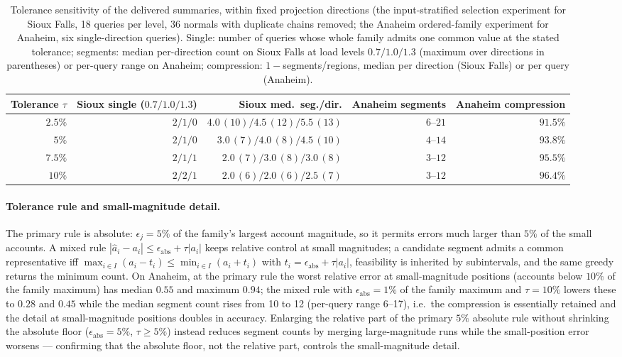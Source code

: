 \begin{table}[pos=htbp]\centering\footnotesize
\caption{Tolerance sensitivity of the delivered summaries, within
fixed projection directions (the input-stratified selection experiment for Sioux Falls, 18 queries
per level, 36 normals with duplicate chains removed; the Anaheim ordered-family experiment for
Anaheim, six single-direction queries). Single: number of queries whose
whole family admits one common value at the stated tolerance;
segments: median per-direction count on Sioux Falls at load levels
$0.7/1.0/1.3$ (maximum over directions in parentheses) or per-query
range on Anaheim; compression: $1-$segments/regions, median per
direction (Sioux Falls) or per query (Anaheim).}\label{tab:tolerance}
\begin{tabular}{rrrrr}\toprule
Tolerance $\tau$ & Sioux single ($0.7/1.0/1.3$) & Sioux med.\ seg./dir. & Anaheim segments & Anaheim compression\\\midrule
$2.5\%$ & $2/1/0$ & $4.0\,(10)/4.5\,(12)/5.5\,(13)$ & $6$--$21$ & $91.5\%$\\
$5\%$ & $2/1/0$ & $3.0\,(7)/4.0\,(8)/4.5\,(10)$ & $4$--$14$ & $93.8\%$\\
$7.5\%$ & $2/1/1$ & $2.0\,(7)/3.0\,(8)/3.0\,(8)$ & $3$--$12$ & $95.5\%$\\
$10\%$ & $2/2/1$ & $2.0\,(6)/2.0\,(6)/2.5\,(7)$ & $3$--$12$ & $96.4\%$\\
\bottomrule\end{tabular}\end{table}

\paragraph{Tolerance rule and small-magnitude detail.}\label{supp:tolerance}
The primary rule is absolute: $\epsilon_j=5\%$ of the family's largest
account magnitude, so it permits errors much larger than $5\%$ of the
small accounts. A mixed rule
$|\hat a_i-a_i|\le\epsilon_{\mathrm{abs}}+\tau|a_i|$ keeps relative
control at small magnitudes; a candidate segment admits a common
representative iff $\max_{i\in I}(a_i-t_i)\le\min_{i\in I}(a_i+t_i)$
with $t_i=\epsilon_{\mathrm{abs}}+\tau|a_i|$, feasibility is inherited
by subintervals, and the same greedy returns the minimum count. On
Anaheim, at the primary rule the worst relative error at
small-magnitude positions (accounts below $10\%$ of the family
maximum) has median $0.55$ and maximum $0.94$; the mixed rule with
$\epsilon_{\mathrm{abs}}=1\%$ of the family maximum and $\tau=10\%$
lowers these to $0.28$ and $0.45$ while the median segment count rises
from 10 to 12 (per-query range 6--17), i.e.\ the compression is
essentially retained and the detail at small-magnitude positions
doubles in accuracy. Enlarging the relative part of the primary
$5\%$ absolute rule without shrinking the absolute floor
($\epsilon_{\mathrm{abs}}=5\%$, $\tau\ge5\%$) instead reduces
segment counts by merging large-magnitude runs while the
small-position error worsens --- confirming that the absolute floor,
not the relative part, controls the small-magnitude detail.

